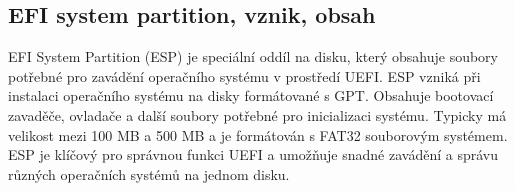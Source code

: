 \subsection{EFI system partition, vznik, obsah}
EFI System Partition (ESP) je speciální oddíl na disku, který obsahuje soubory potřebné pro zavádění operačního systému v prostředí UEFI. ESP vzniká při instalaci operačního systému na disky formátované s GPT. Obsahuje bootovací zavaděče, ovladače a další soubory potřebné pro inicializaci systému. Typicky má velikost mezi 100 MB a 500 MB a je formátován s FAT32 souborovým systémem. ESP je klíčový pro správnou funkci UEFI a umožňuje snadné zavádění a správu různých operačních systémů na jednom disku.